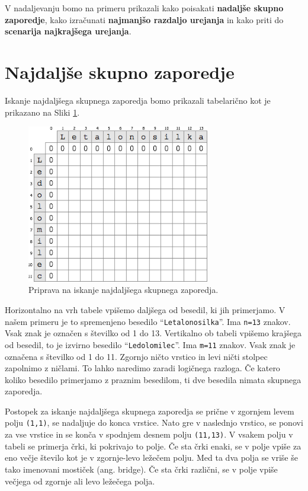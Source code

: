 \documentclass[a4paper, 12pt, twoside]{book}
\begin{document}
V nadaljevanju bomo na primeru prikazali kako poisakati \textbf{nadaljše skupno zaporedje}, kako izračunati \textbf{najmanjšo razdaljo urejanja} in kako priti do \textbf{scenarija najkrajšega urejanja}.

\section{Najdaljše skupno zaporedje}
\label{sec:lcs}

Iskanje najdaljšega skupnega zaporedja bomo prikazali tabelarično \cite{lcs} kot je prikazano na Sliki \ref{lcs1}. 

\begin{figure}[placement h]
\begin{center}
\includegraphics[width=8cm]{lcs1.png}
\end{center}
\caption{Priprava na iskanje najdaljšega skupnega zaporedja.}
\label{lcs1}
\end{figure}

Horizontalno na vrh tabele vpišemo daljšega od besedil, ki jih primerjamo. V našem primeru je to spremenjeno besedilo “{\tt Letalonosilka}”. Ima  {\tt n=13} znakov. Vsak znak je označen s številko od 1 do 13. Vertikalno ob tabeli vpišemo krajšega od besedil, to je izvirno besedilo “{\tt Ledolomilec}”. Ima  {\tt m=11} znakov. Vsak znak je označena s številko od 1 do 11. Zgornjo ničto vrstico in levi ničti stolpec zapolnimo z ničlami. To lahko naredimo zaradi logičnega razloga. Če katero koliko besedilo primerjamo z praznim besedilom, ti dve besedila nimata skupnega zaporedja.

Postopek za iskanje najdaljšega skupnega zaporedja se prične v zgornjem levem polju {\tt (1,1)}, se nadaljuje do konca vrstice. Nato gre v naslednjo vrstico, se ponovi za vse vrstice in se konča v spodnjem desnem polju {\tt (11,13)}. V vsakem polju v tabeli se primerja črki, ki pokrivajo to polje. Če sta črki enaki, se v polje vpiše za eno večje število kot je v zgornje-levo ležečem polju. Med ta dva polja se vriše še tako imenovani mostiček (ang. bridge). Če sta črki različni, se v polje vpiše večjega od zgornje ali levo ležečega polja.
\end{document}
